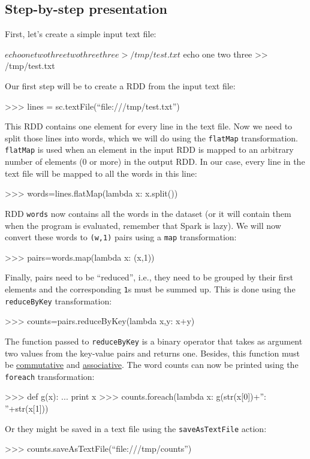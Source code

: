 \documentclass[11pt]{article}
\begin{document}
\subsection{Step-by-step presentation}

First, let's create a simple input text file:
\begin{cli}
  $ echo one two three two three three > /tmp/test.txt
  $ echo one two three >> /tmp/test.txt
\end{cli}
Our first step will be to create a RDD from the input text file:
\begin{cli}
  >>> lines = sc.textFile(``file:///tmp/test.txt'')
\end{cli}
This RDD contains one element for every line in the text file.  Now we
need to split those lines into words, which we will do using the
\texttt{flatMap} transformation.  \texttt{flatMap} is used when an
element in the input RDD is mapped to an arbitrary number of elements
(0 or more) in the output RDD. In our case, every line in the text
file will be mapped to all the words in this line:
\begin{cli}
  >>> words=lines.flatMap(lambda x: x.split())
\end{cli}
RDD \texttt{words} now contains all the words in the dataset (or it
will contain them when the program is evaluated, remember that Spark
is lazy). We will now convert these words to \texttt{(w,1)} pairs using a
\texttt{map} transformation:
\begin{cli}
  >>> pairs=words.map(lambda x: (x,1))
\end{cli}
Finally, pairs need to be ``reduced'', i.e., they need to be grouped
by their first elements and the corresponding \texttt{1}s must be
summed up. This is done using the \texttt{reduceByKey} transformation:
\begin{cli}
  >>> counts=pairs.reduceByKey(lambda x,y: x+y)
\end{cli}
The function passed to \texttt{reduceByKey} is a binary
operator that takes as argument two values from the key-value pairs
and returns one. Besides, this function must be
\underline{commutative} and \underline{associative}. 
The word counts can now be printed using the \texttt{foreach} transformation:
\begin{cli}
  >>> def g(x):
  ...   print x
  >>> counts.foreach(lambda x: g(str(x[0])+'': ''+str(x[1]))
\end{cli}
Or they might be saved in a text file using the \texttt{saveAsTextFile} action:
\begin{cli}
  >>> counts.saveAsTextFile(``file:///tmp/counts'')
\end{cli}
\end{document}

